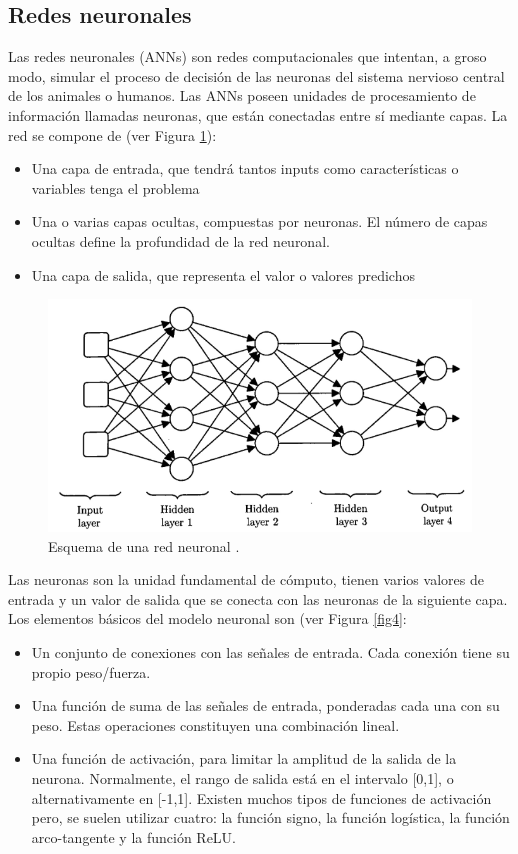 \subsection{Redes neuronales}
Las redes neuronales (ANNs) \cite{24, 25, 27} son redes computacionales que intentan, a groso modo, simular el proceso de decisión de las neuronas del sistema nervioso central de los animales o humanos. Las ANNs poseen unidades de procesamiento de información llamadas neuronas, que están conectadas entre sí mediante capas. La red se compone de (ver Figura \ref{fig3}):
\begin{itemize}
	\item Una capa de entrada, que tendrá tantos inputs como características o variables tenga el problema
	\item Una o varias capas ocultas, compuestas por neuronas. El número de capas ocultas define la profundidad de la red neuronal.
	\item Una capa de salida, que representa el valor o valores predichos
\end{itemize} 

\begin{figure}[h]
	\centering
	\includegraphics[scale=0.5]{imagenes/cap2/neural-network.png}
	\caption{Esquema de una red neuronal \cite{26}.}
	\label{fig3}
\end{figure}

Las neuronas son la unidad fundamental de cómputo, tienen varios valores de entrada y un valor de salida que se conecta con las neuronas de la siguiente capa. Los elementos básicos del modelo neuronal son (ver Figura \ref{fig4}:

\begin{itemize}
	\item Un conjunto de conexiones con las señales de entrada. Cada conexión tiene su propio peso/fuerza.
	\item Una función de suma de las señales de entrada, ponderadas cada una con su peso. Estas operaciones constituyen una combinación lineal.
	\item Una función de activación, para limitar la amplitud de la salida de la neurona. Normalmente, el rango de salida está en el intervalo [0,1], o alternativamente en [-1,1]. Existen muchos tipos de funciones de activación pero, se suelen utilizar cuatro: la función signo, la función logística, la función arco-tangente y la función ReLU.
\end{itemize} 

